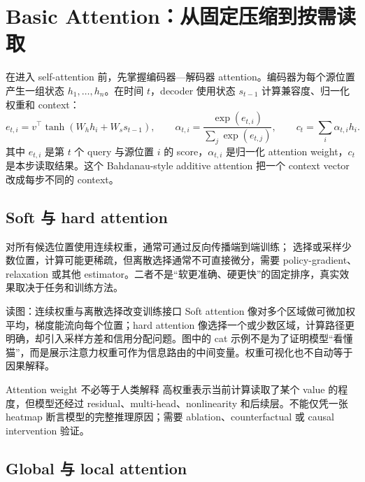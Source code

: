 \section{Basic Attention：从固定压缩到按需读取}

在进入 self-attention 前，先掌握编码器—解码器 attention。编码器为每个源位置产生一组状态 $h_1,\ldots,h_n$。在时间 $t$，decoder 使用状态 $s_{t-1}$ 计算兼容度、归一化权重和 context：
\[
e_{t,i}=v^\top\tanh(W_hh_i+W_ss_{t-1}),\qquad
\alpha_{t,i}=\frac{\exp(e_{t,i})}{\sum_j\exp(e_{t,j})},\qquad
c_t=\sum_i\alpha_{t,i}h_i.
\]
其中 $e_{t,i}$ 是第 $t$ 个 query 与源位置 $i$ 的 score，$\alpha_{t,i}$ 是归一化 attention weight，$c_t$ 是本步读取结果。这个 Bahdanau-style additive attention 把一个 context vector 改成每步不同的 context。

\subsection{Soft 与 hard attention}

 对所有候选位置使用连续权重，通常可通过反向传播端到端训练； 选择或采样少数位置，计算可能更稀疏，但离散选择通常不可直接微分，需要 policy-gradient、relaxation 或其他 estimator。二者不是“软更准确、硬更快”的固定排序，真实效果取决于任务和训练方法。


\begin{knowledgebox}{读图：连续权重与离散选择改变训练接口}
Soft attention 像对多个区域做可微加权平均，梯度能流向每个位置；hard attention 像选择一个或少数区域，计算路径更明确，却引入采样方差和信用分配问题。图中的 cat 示例不是为了证明模型“看懂猫”，而是展示注意力权重可作为信息路由的中间变量。权重可视化也不自动等于因果解释。
\end{knowledgebox}

\begin{warningbox}{Attention weight 不必等于人类解释}
高权重表示当前计算读取了某个 value 的程度，但模型还经过 residual、multi-head、nonlinearity 和后续层。不能仅凭一张 heatmap 断言模型的完整推理原因；需要 ablation、counterfactual 或 causal intervention 验证。
\end{warningbox}

\subsection{Global 与 local attention}

